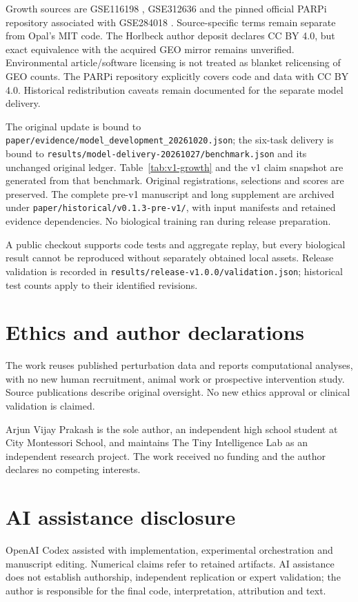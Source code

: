 \documentclass{article}
\begin{document}
Growth sources are GSE116198 \citep{horlbeck2018}, GSE312636 \citep{herken2026} and the pinned official PARPi repository associated with GSE284018 \citep{simpson2023}. Source-specific terms remain separate from Opal's MIT code. The Horlbeck author deposit declares CC BY 4.0, but exact equivalence with the acquired GEO mirror remains unverified. Environmental article/software licensing is not treated as blanket relicensing of GEO counts. The PARPi repository explicitly covers code and data with CC BY 4.0. Historical redistribution caveats remain documented for the separate model delivery.

The original update is bound to \texttt{paper/evidence/model\_development\_20261020.json}; the six-task delivery is bound to \texttt{results/model-delivery-20261027/benchmark.json} and its unchanged original ledger. Table~\ref{tab:v1-growth} and the v1 claim snapshot are generated from that benchmark. Original registrations, selections and scores are preserved. The complete pre-v1 manuscript and long supplement are archived under \texttt{paper/historical/v0.1.3-pre-v1/}, with input manifests and retained evidence dependencies. No biological training ran during release preparation.

A public checkout supports code tests and aggregate replay, but every biological result cannot be reproduced without separately obtained local assets. Release validation is recorded in \texttt{results/release-v1.0.0/validation.json}; historical test counts apply to their identified revisions.

\section*{Ethics and author declarations}
The work reuses published perturbation data and reports computational analyses, with no new human recruitment, animal work or prospective intervention study. Source publications describe original oversight. No new ethics approval or clinical validation is claimed.

Arjun Vijay Prakash is the sole author, an independent high school student at City Montessori School, and maintains The Tiny Intelligence Lab as an independent research project. The work received no funding and the author declares no competing interests.

\section*{AI assistance disclosure}
OpenAI Codex assisted with implementation, experimental orchestration and manuscript editing. Numerical claims refer to retained artifacts. AI assistance does not establish authorship, independent replication or expert validation; the author is responsible for the final code, interpretation, attribution and text.

\clearpage
\begingroup\small


\endgroup
\end{document}
